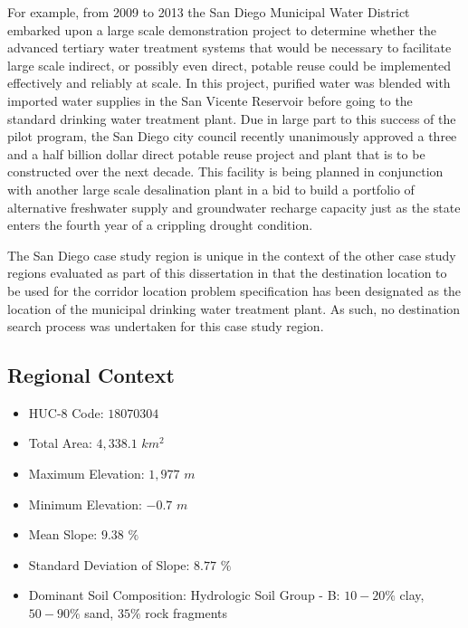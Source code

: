 For example, from 2009 to 2013 the San Diego Municipal Water District embarked upon a large scale demonstration project to determine whether the advanced tertiary water treatment systems that would be necessary to facilitate large scale indirect, or possibly even direct, potable reuse could be implemented effectively and reliably at scale. In this project, purified water was blended with imported water supplies in the San Vicente Reservoir before going to the standard drinking water treatment plant. Due in large part to this success of the pilot program, the San Diego city council recently unanimously approved a three and a half billion dollar direct potable reuse project and plant that is to be constructed over the next decade. This facility is being planned in conjunction with another large scale desalination plant in a bid to build a portfolio of alternative freshwater supply and groundwater recharge capacity just as the state enters the fourth year of a crippling drought condition.

The San Diego case study region is unique in the context of the other case study regions evaluated as part of this dissertation in that the destination location to be used for the corridor location problem specification has been designated as the location of the municipal drinking water treatment plant. As such, no destination search process was undertaken for this case study region.

    \subsection{Regional Context}
    
    \begin{itemize}
      \setlength{\itemsep}{0cm}
      \setlength{\parskip}{0cm}
        \item HUC-8 Code: $18070304$
        \item Total Area: $4,338.1$ $km^2$
        \item Maximum Elevation: $1,977$ $m$
        \item Minimum Elevation: $-0.7$ $m$
        \item Mean Slope: $9.38$ $\%$
        \item Standard Deviation of Slope: $8.77$ $\%$
        \item Dominant Soil Composition: Hydrologic Soil Group - B: $10-20\%$ clay, $50-90\%$ sand, $35\%$ rock fragments
    \end{itemize}
    
